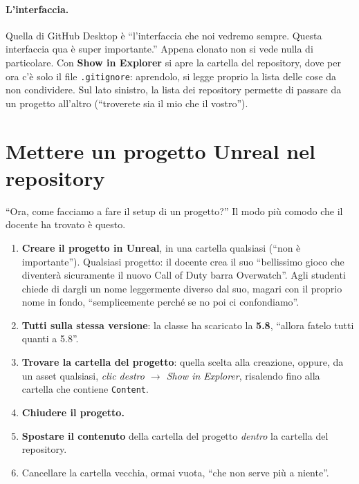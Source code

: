 \paragraph{L'interfaccia.} Quella di GitHub Desktop è ``l'interfaccia che noi
vedremo sempre. Questa interfaccia qua è super importante.'' Appena clonato non
si vede nulla di particolare. Con \textbf{Show in Explorer} si apre la cartella
del repository, dove per ora c'è solo il file \texttt{.gitignore}: aprendolo, si
legge proprio la lista delle cose da non condividere. Sul lato sinistro, la
lista dei repository permette di passare da un progetto all'altro (``troverete
sia il mio che il vostro'').

\section{Mettere un progetto Unreal nel repository}
\label{gd13:sec:setup}

``Ora, come facciamo a fare il setup di un progetto?'' Il modo più comodo che
il docente ha trovato è questo.
\begin{enumerate}
  \item \textbf{Creare il progetto in Unreal}, in una cartella qualsiasi (``non
        è importante''). Qualsiasi progetto: il docente crea il suo ``bellissimo
        gioco che diventerà sicuramente il nuovo Call of Duty barra Overwatch''.
        Agli studenti chiede di dargli un nome leggermente diverso dal suo,
        magari con il proprio nome in fondo, ``semplicemente perché se no poi ci
        confondiamo''.
  \item \textbf{Tutti sulla stessa versione}: la classe ha scaricato la
        \textbf{5.8}, ``allora fatelo tutti quanti a 5.8''.
  \item \textbf{Trovare la cartella del progetto}: quella scelta alla creazione,
        oppure, da un asset qualsiasi, \emph{clic destro $\rightarrow$ Show in
        Explorer}, risalendo fino alla cartella che contiene
        \texttt{Content}.
  \item \textbf{Chiudere il progetto.}
  \item \textbf{Spostare il contenuto} della cartella del progetto
        \emph{dentro} la cartella del repository.
  \item Cancellare la cartella vecchia, ormai vuota, ``che non serve più a
        niente''.
\end{enumerate}


